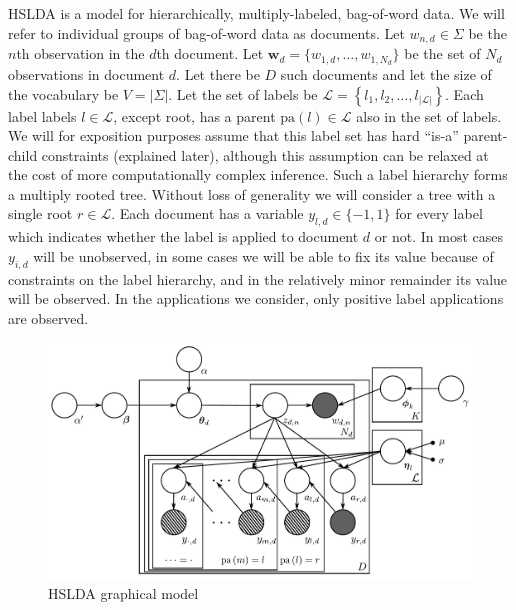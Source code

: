 HSLDA is a model for hierarchically, multiply-labeled, bag-of-word data.  We
will refer to individual groups of bag-of-word data as documents.  Let $w_{n,d}
\in \Sigma$ be the $n$th observation in the $d$th document.  Let $\mathbf{w}_d
= \{w_{1,d},\ldots,w_{1,N_d}\}$ be the  set of $N_d$ observations in document
$d$.  Let there be $D$ such documents and let the size of the vocabulary be
$V=|\Sigma|$.  Let the set of labels be $\mathcal{L}=\left\{
  l_{1},l_{2},\ldots,l_{\left|\mathcal{L}\right|}\right\} $. Each label labels
$l \in \mathcal{L}$, except root, has a parent $\mathrm{pa}(l) \in \mathcal{L}$
also in the set of labels. 
 We will for exposition purposes assume that this label set has hard ``is-a''
 parent-child constraints (explained later), although this assumption can be
 relaxed at the cost of more computationally complex inference.  Such a label hierarchy forms a multiply rooted tree.  Without loss of generality we will consider a tree with a single root $r\in\mathcal{L}$.  Each document has a variable $y_{l,d} \in \{-1,1\}$ for every label which indicates whether the label is applied to document $d$ or not.   In most cases $y_{i,d}$ will be unobserved, in some cases we will be able to fix its value because of  constraints on the label hierarchy, and in the relatively minor remainder its value will be observed.  In the applications we consider, only positive label applications are observed.  
 
\begin{figure}[t]
 \centering \includegraphics[scale=0.25]{Graphical_Model-final} \caption{HSLDA graphical model}


\label{fig:graphical_model} 
\end{figure}

